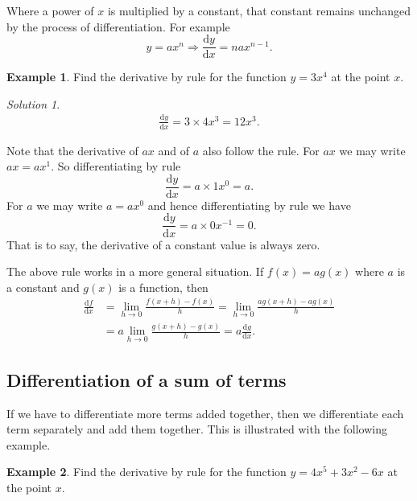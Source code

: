 \documentclass[
  11pt,
  oneside]{book}
\newcommand{\slide}{}
\theoremstyle{definition}
\theoremstyle{definition}
\newtheorem{example}{Example}[chapter]
\theoremstyle{definition}
\theoremstyle{definition}
\theoremstyle{remark}
\newtheorem*{solution}{Solution}
\begin{document}
Where a power of \(x\) is multiplied by a constant, that constant remains unchanged by the process of differentiation. For example
\[
y = ax^n \Rightarrow \frac{\mathrm{d} y}{\mathrm{d} x} = nax^{n-1}.
\]

\begin{example}
Find the derivative by rule for the function \(y = 3x^4\) at the point \(x\).
\end{example}

\begin{solution}
\begin{gather*}
\frac{\mathrm{d} y}{\mathrm{d} x} = 3\times4x^3 = 12 x^3.
\end{gather*}
\end{solution}

\slide

Note that the derivative of \(ax\) and of \(a\) also follow the rule. For \(ax\) we may write \(ax = ax^1\). So differentiating by rule
\[
\frac{\mathrm{d} y}{\mathrm{d} x} = a\times1x^0 = a.
\]
For \(a\) we may write \(a = ax^0\) and hence differentiating by rule we have
\[
\frac{\mathrm{d} y}{\mathrm{d} x} = a\times0x^{-1} = 0.
\]
That is to say, the derivative of a constant value is always zero.

\slide

The above rule works in a more general situation. If \(f(x) = ag(x)\) where \(a\) is a constant and \(g(x)\) is a function, then
\begin{align*}
\frac{\mathrm{d} f}{\mathrm{d} x} &= \lim\limits_{h\to0}\frac{f(x+h)-f(x)}{h} = \lim\limits_{h\to0}\frac{ag(x+h)-ag(x)}{h} \\ &= a\lim\limits_{h\to0}\frac{g(x+h)-g(x)}{h} = a\frac{\mathrm{d} g}{\mathrm{d} x}.
\end{align*}

\slide

\subsection{Differentiation of a sum of terms}\label{differentiation-of-a-sum-of-terms}

If we have to differentiate more terms added together, then we differentiate each term separately and add them together. This is illustrated with the following example.

\begin{example}
Find the derivative by rule for the function \(y = 4x^5+3x^2-6x\) at the point \(x\).
\end{example}
\end{document}
